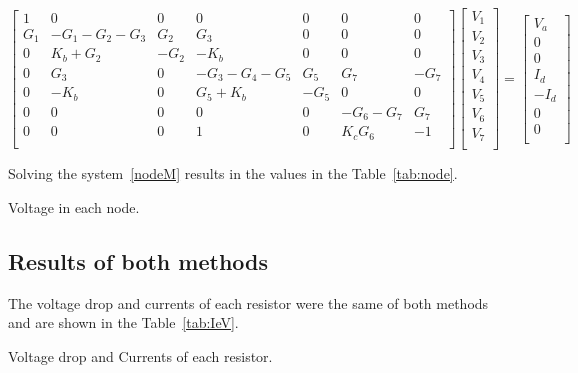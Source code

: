 \begin{equation}\label{nodeM}
  \begin{bmatrix}
    1 & 0 & 0 & 0 & 0 & 0 & 0 \\
    G_1 & -G_1-G_2-G_3 & G_2 & G_3 & 0 & 0 & 0 \\
    0 & K_b+G_2 & -G_2 & -K_b & 0 & 0 & 0 \\
    0 & G_3 & 0 & -G_3-G_4-G_5 & G_5 & G_7 & -G_7 \\
    0 & -K_b & 0 & G_5+K_b & -G_5 & 0 & 0 \\
    0 & 0 & 0 & 0 & 0 & -G_6-G_7 & G_7 \\
    0 & 0 & 0 & 1 & 0 & K_cG_6 & -1 \\
  \end{bmatrix}
  \begin{bmatrix}
    V_1\\
    V_2\\
    V_3\\
    V_4\\
    V_5\\
    V_6\\
    V_7\\
  \end{bmatrix}
  =
  \begin{bmatrix}
    V_a\\
    0\\
    0\\
    I_d\\
    -I_d\\
    0\\
    0\\
  \end{bmatrix}
\end{equation}

Solving the system~\ref{nodeM} results in the values in the Table~\ref{tab:node}.

\begin{table}[ht!]
  \centering
  
  \caption{Voltage in each node.}
  \label{tab:node}
\end{table}
\FloatBarrier



\subsection{Results of both methods}
The voltage drop and currents of each resistor were the same of both methods and are shown in the Table~\ref{tab:IeV}.

\begin{table}[ht!]
  \centering
  
  \caption{Voltage drop and Currents of each resistor.}
  \label{tab:IeV}
\end{table}
\FloatBarrier

